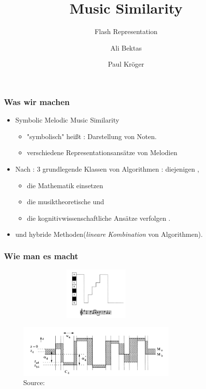 \documentclass{beamer}
\title{Music Similarity}
\subtitle{Flash Representation}
\author{Ali Bektas \and Paul Kröger}
\begin{document}
	\begin{frame}
		\maketitle
	\end{frame}
	\begin{frame}
  		\frametitle{Was wir machen}
  		\begin{itemize}
  			\item Symbolic Melodic Music Similarity 
  			\begin{itemize}
  				\item "symbolisch" heißt : Darstellung von Noten.
  				\item verschiedene Representationsansätze von Melodien 
  			\end{itemize} 
			\item Nach \cite{two} : 3 grundlegende Klassen von Algorithmen : diejenigen ,
			\begin{itemize}
				\item die Mathematik einsetzen
				\item die musiktheoretische und
				\item die kognitivwissenschaftliche Ansätze verfolgen .
			\end{itemize}
			\item und hybride Methoden(\textit{lineare Kombination} von Algorithmen).
  		\end{itemize}
	\end{frame}
	\begin{frame}
  		\frametitle{Wie man es macht}
  		\begin{figure}[h!]
					\includegraphics[width=300px,height=100px,keepaspectratio]{abb_1}
		\end{figure}
		\begin{figure}[h!]
					\includegraphics[width=300px,height=100px,keepaspectratio]{abb_2}
					\caption{Source: \cite{one}}
		\end{figure}
	\end{frame}
\end{document}
